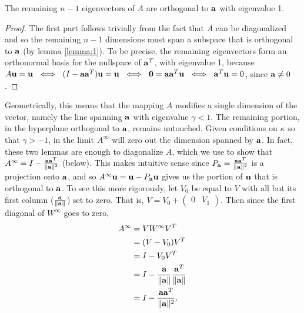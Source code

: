 \begin{lemma}\label{lemma:2} The remaining $n-1$ eigenvectors of $A$ are orthogonal to $\mathbf{a}$ with eigenvalue 1.\end{lemma}

\begin{proof} The first part follows trivially from the fact that $A$ can be diagonalized and so the remaining $n-1$ dimensions must span a subspace that is orthogonal to $\mathbf{a}$ (by lemma \ref{lemma:1}). To be precise, the remaining eigenvectors form an orthonormal basis for the nullspace of $\mathbf{a}^T$, with eigenvalue 1, because
$A\mathbf{u} = \mathbf{u} \ \iff{}\  ( I - \mathbf{a}\mathbf{a}^T ) \mathbf{u} = \mathbf{u} \ \iff{}\  \mathbf{0} = \mathbf{a}\mathbf{a}^T\mathbf{u} \ \iff{}\  \mathbf{a}^T \mathbf{u} = 0$, since $\mathbf{a} \ne 0$.
\end{proof}

Geometrically, this means that the mapping $A$ modifies a single dimension of the vector, namely the line spanning $\mathbf{a}$ with eigenvalue $\gamma < 1$. The remaining portion, in the hyperplane orthogonal to $\mathbf{a}$, remains untouched. Given conditions on $\kappa$ so that $\gamma > -1$, in the limit $A^\infty$ will zero out the dimension spanned by $\mathbf{a}$. In fact, these two lemmas are enough to diagonalize $A$, which we use to show that $A^\infty = I - \frac{\mathbf{a}\mathbf{a}^T}{\|\mathbf{a}\|^2}$ (below). This makes intuitive sense since $P_{\mathbf{a}} = \frac{\mathbf{a}\mathbf{a}^T}{\|\mathbf{a}\|^2}$ is a projection onto $\mathbf{a}$, and so $A^\infty \mathbf{u} = \mathbf{u} - P_{\mathbf{a}} \mathbf{u}$ gives us the portion of $\mathbf{u}$ that is orthogonal to $\mathbf{a}$. To see this more rigorously, let $V_0$ be equal to $V$ with all but its first column ($\frac{\mathbf{a}}{\|\mathbf{a}\|}$) set to zero. That is, $V = V_0 + \begin{pmatrix}0 & V_1\end{pmatrix}$. Then since the first diagonal of $W^\infty$ goes to zero,
\begin{align*}
A^\infty &= VW^\infty V^T \\
         &= (V - V_0)V^T \\
         &= I - V_0 V^T \\
         &= I - \frac{\mathbf{a}}{\|\mathbf{a}\|}\frac{\mathbf{a}^T}{\|\mathbf{a}\|} \\
         &= I - \frac{\mathbf{a}\mathbf{a}^T}{\|\mathbf{a}\|^2} .
\end{align*}

